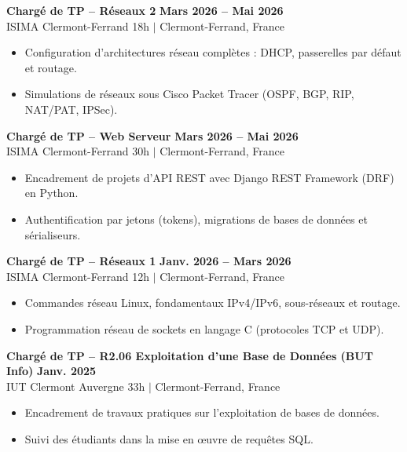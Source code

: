 \documentclass[a4paper,10pt]{article}
\begin{document}
\textbf{Chargé de TP -- Réseaux 2} \hfill \textbf{Mars 2026 -- Mai 2026}\\
\textcolor{textgray}{ISIMA Clermont-Ferrand \hfill 18h $|$ Clermont-Ferrand, France}
\begin{itemize}
    \item Configuration d'architectures réseau complètes : DHCP, passerelles par défaut et routage.
    \item Simulations de réseaux sous Cisco Packet Tracer (OSPF, BGP, RIP, NAT/PAT, IPSec).
\end{itemize}

\vspace{2pt}

\textbf{Chargé de TP -- Web Serveur} \hfill \textbf{Mars 2026 -- Mai 2026}\\
\textcolor{textgray}{ISIMA Clermont-Ferrand \hfill 30h $|$ Clermont-Ferrand, France}
\begin{itemize}
    \item Encadrement de projets d'API REST avec Django REST Framework (DRF) en Python.
    \item Authentification par jetons (tokens), migrations de bases de données et sérialiseurs.
\end{itemize}

\vspace{2pt}

\textbf{Chargé de TP -- Réseaux 1} \hfill \textbf{Janv. 2026 -- Mars 2026}\\
\textcolor{textgray}{ISIMA Clermont-Ferrand \hfill 12h $|$ Clermont-Ferrand, France}
\begin{itemize}
    \item Commandes réseau Linux, fondamentaux IPv4/IPv6, sous-réseaux et routage.
    \item Programmation réseau de sockets en langage C (protocoles TCP et UDP).
\end{itemize}

\vspace{2pt}

\textbf{Chargé de TP -- R2.06 Exploitation d'une Base de Données (BUT Info)} \hfill \textbf{Janv. 2025}\\
\textcolor{textgray}{IUT Clermont Auvergne \hfill 33h $|$ Clermont-Ferrand, France}
\begin{itemize}
    \item Encadrement de travaux pratiques sur l’exploitation de bases de données.
    \item Suivi des étudiants dans la mise en œuvre de requêtes SQL.
\end{itemize}
\end{document}
